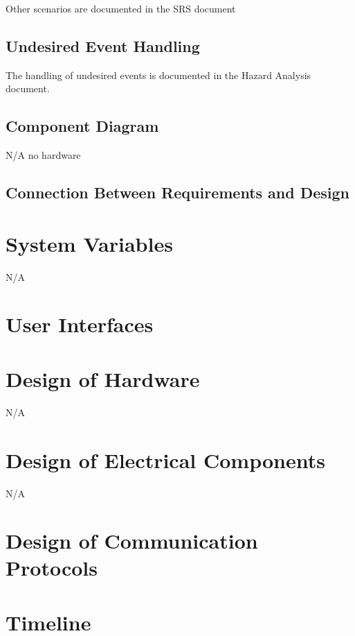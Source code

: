 \documentclass[12pt, titlepage]{article}
\begin{document}
\noindent
Other scenarios are documented in the SRS document

\subsection{Undesired Event Handling}

The handling of undesired events is documented in the Hazard Analysis document.

\subsection{Component Diagram}

N/A no hardware

\subsection{Connection Between Requirements and Design} \label{SecConnection}

\section{System Variables}

N/A

\section{User Interfaces}


\section{Design of Hardware}

N/A

\section{Design of Electrical Components}

N/A

\section{Design of Communication Protocols}

\section{Timeline}
\end{document}

